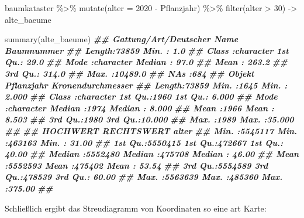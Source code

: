\documentclass[11pt,german,a4paper]{article}
\newenvironment{Shaded}{\begin{snugshade}}{\end{snugshade}}
\newcommand{\AttributeTok}[1]{\textcolor[rgb]{0.77,0.63,0.00}{#1}}
\newcommand{\DecValTok}[1]{\textcolor[rgb]{0.00,0.00,0.81}{#1}}
\newcommand{\DocumentationTok}[1]{\textcolor[rgb]{0.56,0.35,0.01}{\textbf{\textit{#1}}}}
\newcommand{\FunctionTok}[1]{\textcolor[rgb]{0.00,0.00,0.00}{#1}}
\newcommand{\NormalTok}[1]{#1}
\newcommand{\OtherTok}[1]{\textcolor[rgb]{0.56,0.35,0.01}{#1}}
\newcommand{\SpecialCharTok}[1]{\textcolor[rgb]{0.00,0.00,0.00}{#1}}
\begin{document}
\begin{Shaded}
\begin{Highlighting}[]
\NormalTok{baumkataster }\SpecialCharTok{\%\textgreater{}\%}
  \FunctionTok{mutate}\NormalTok{(}\AttributeTok{alter =} \DecValTok{2020} \SpecialCharTok{{-}}\NormalTok{ Pflanzjahr) }\SpecialCharTok{\%\textgreater{}\%}
  \FunctionTok{filter}\NormalTok{(alter }\SpecialCharTok{\textgreater{}} \DecValTok{30}\NormalTok{) }\OtherTok{{-}\textgreater{}}
\NormalTok{  alte\_baeume}

\FunctionTok{summary}\NormalTok{(alte\_baeume)}
\DocumentationTok{\#\#  Gattung/Art/Deutscher Name   Baumnummer     }
\DocumentationTok{\#\#  Length:73859               Min.   :    1.0  }
\DocumentationTok{\#\#  Class :character           1st Qu.:   29.0  }
\DocumentationTok{\#\#  Mode  :character           Median :   97.0  }
\DocumentationTok{\#\#                             Mean   :  263.2  }
\DocumentationTok{\#\#                             3rd Qu.:  314.0  }
\DocumentationTok{\#\#                             Max.   :10489.0  }
\DocumentationTok{\#\#                             NA\textquotesingle{}s   :684      }
\DocumentationTok{\#\#     Objekt            Pflanzjahr   Kronendurchmesser}
\DocumentationTok{\#\#  Length:73859       Min.   :1645   Min.   : 2.000   }
\DocumentationTok{\#\#  Class :character   1st Qu.:1960   1st Qu.: 6.000   }
\DocumentationTok{\#\#  Mode  :character   Median :1974   Median : 8.000   }
\DocumentationTok{\#\#                     Mean   :1966   Mean   : 8.503   }
\DocumentationTok{\#\#                     3rd Qu.:1980   3rd Qu.:10.000   }
\DocumentationTok{\#\#                     Max.   :1989   Max.   :35.000   }
\DocumentationTok{\#\#                                                     }
\DocumentationTok{\#\#     HOCHWERT         RECHTSWERT         alter       }
\DocumentationTok{\#\#  Min.   :5545117   Min.   :463163   Min.   : 31.00  }
\DocumentationTok{\#\#  1st Qu.:5550415   1st Qu.:472667   1st Qu.: 40.00  }
\DocumentationTok{\#\#  Median :5552480   Median :475708   Median : 46.00  }
\DocumentationTok{\#\#  Mean   :5552593   Mean   :475402   Mean   : 53.54  }
\DocumentationTok{\#\#  3rd Qu.:5554589   3rd Qu.:478539   3rd Qu.: 60.00  }
\DocumentationTok{\#\#  Max.   :5563639   Max.   :485360   Max.   :375.00  }
\DocumentationTok{\#\# }
\end{Highlighting}
\end{Shaded}

Schließlich ergibt das Streudiagramm von Koordinaten so eine art Karte:
\end{document}
